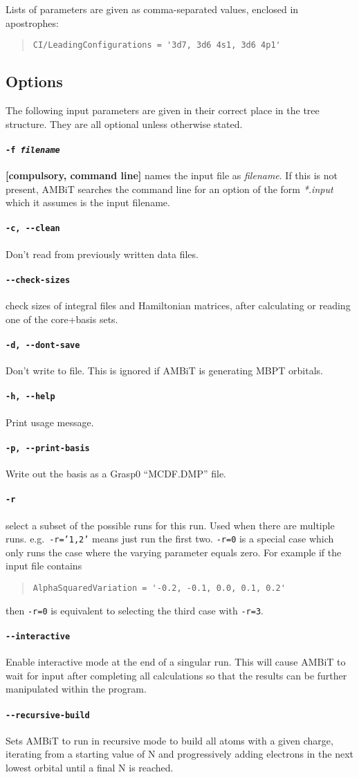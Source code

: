 \documentclass[a4paper,11pt]{article}
\newcommand{\option}[1]{\paragraph{\texttt{#1}}}
\begin{document}
Lists of parameters are given as comma-separated values, enclosed in apostrophes:
\begin{quote}
\begin{verbatim}
CI/LeadingConfigurations = '3d7, 3d6 4s1, 3d6 4p1'
\end{verbatim}
\end{quote}

\subsection{Options}
The following input parameters are given in their correct place in the tree structure. They are all optional unless otherwise stated.

\option{-f \emph{filename}} \textbf{[compulsory, command line]} names the input file as \emph{filename}. If this is not present, AMBiT searches the command line for an option of the form \emph{*.input} which it assumes is the input filename. 

\option{-c, -{}-clean} Don't read from previously written data files.
\option{-{}-check-sizes} check sizes of integral files and Hamiltonian matrices, after calculating or reading one of the core+basis sets.
\option{-d, -{}-dont-save} Don't write to file. This is ignored if AMBiT is generating MBPT orbitals.

\option{-h, -{}-help} Print usage message.

\option{-p, -{}-print-basis} Write out the basis as a Grasp0 ``MCDF.DMP'' file.

\option{-r} select a subset of the possible runs for this run. Used when there are multiple runs. e.g.~\texttt{-r='1,2'} means just run the first two. \texttt{-r=0} is a special case which only runs the case where the varying parameter equals zero. For example if the input file contains

\begin{quote}
\begin{verbatim}
AlphaSquaredVariation = '-0.2, -0.1, 0.0, 0.1, 0.2'
\end{verbatim}
\end{quote}
then \texttt{-r=0} is equivalent to selecting the third case with \texttt{-r=3}.

\option{-{}-interactive} Enable interactive mode at the end of a singular run. This will cause AMBiT to wait for input after completing all calculations so that the results can be further manipulated within the program.
\option{-{}-recursive-build} Sets AMBiT to run in recursive mode to build all atoms with a given charge, iterating from a starting value of N and progressively adding electrons in the next lowest orbital until a final N is reached.
\end{document}
